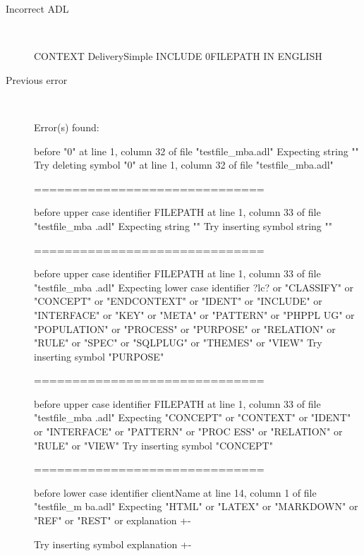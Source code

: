 \hrulefill

\begin{description}
  \item[Incorrect ADL]~\\
\begin{adl}
CONTEXT DeliverySimple INCLUDE 0FILEPATH IN ENGLISH\end{adl}
  \item[Previous error]~\\
\begin{haskell}
Error(s) found:

before "0" at line 1, column 32 of file "testfile_mba.adl"
Expecting string ""
Try deleting symbol "0" at line 1, column 32 of file "testfile_mba.adl"

==============================

before upper case identifier FILEPATH at line 1, column 33 of file "testfile_mba
.adl"
Expecting string ""
Try inserting symbol string ""

==============================

before upper case identifier FILEPATH at line 1, column 33 of file "testfile_mba
.adl"
Expecting lower case identifier ?lc? or "CLASSIFY" or "CONCEPT" or "ENDCONTEXT"
or "IDENT" or "INCLUDE" or "INTERFACE" or "KEY" or "META" or "PATTERN" or "PHPPL
UG" or "POPULATION" or "PROCESS" or "PURPOSE" or "RELATION" or "RULE" or "SPEC"
or "SQLPLUG" or "THEMES" or "VIEW"
Try inserting symbol "PURPOSE"

==============================

before upper case identifier FILEPATH at line 1, column 33 of file "testfile_mba
.adl"
Expecting "CONCEPT" or "CONTEXT" or "IDENT" or "INTERFACE" or "PATTERN" or "PROC
ESS" or "RELATION" or "RULE" or "VIEW"
Try inserting symbol "CONCEPT"

==============================

before lower case identifier clientName at line 14, column 1 of file "testfile_m
ba.adl"
Expecting "HTML" or "LATEX" or "MARKDOWN" or "REF" or "REST" or explanation {+-}

Try inserting symbol explanation {+-}


\end{haskell}
\end{description}
